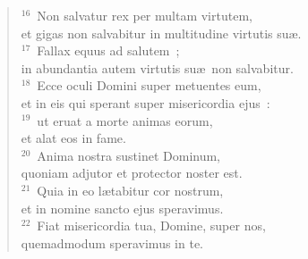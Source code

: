 \begin{flushleft}
\begin{verse}
${}^{16}$~Non salvatur rex per multam virtutem,\\ et gigas non salvabitur in multitudine virtutis su\ae .\\
${}^{17}$~Fallax equus ad salutem~;\\ in abundantia autem virtutis su\ae\ non salvabitur.\\
${}^{18}$~Ecce oculi Domini super metuentes eum,\\ et in eis qui sperant super misericordia ejus~:\\
${}^{19}$~ut eruat a morte animas eorum,\\ et alat eos in fame.\\
${}^{20}$~Anima nostra sustinet Dominum,\\ quoniam adjutor et protector noster est.\\
${}^{21}$~Quia in eo l\ae tabitur cor nostrum,\\ et in nomine sancto ejus speravimus.\\
${}^{22}$~Fiat misericordia tua, Domine, super nos,\\ quemadmodum speravimus in te.\end{verse}\end{flushleft}



